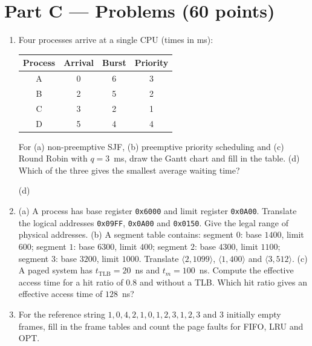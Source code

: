 \documentclass[11pt,a4paper]{article}
\begin{document}
\section*{Part C --- Problems \hfill (60 points)}
\begin{enumerate}[leftmargin=2.0em,label=C\arabic*.,itemsep=0.5em]
  \item {} Four processes arrive at a single CPU (times in ms):
  \begin{center}
  \begin{tabular}{@{}cccc@{}}
  \toprule
  \textbf{Process} & \textbf{Arrival} & \textbf{Burst} & \textbf{Priority} \\
  \midrule
  A & 0 & 6 & 3 \\ B & 2 & 5 & 2 \\ C & 3 & 2 & 1 \\ D & 5 & 4 & 4 \\
  \bottomrule
  \end{tabular}
  \end{center}
  For (a) non-preemptive SJF, (b) preemptive priority scheduling and (c) Round Robin with $q = 3$~ms, draw the Gantt chart and fill in the table. (d) Which of the three gives the smallest average waiting time?

  \proctable
  \proctable
  \proctable
  \par\medskip (d) \hrulefill

  \newpage
  \item {}
  (a) A process has base register \texttt{0x6000} and limit register \texttt{0x0A00}. Translate the logical addresses \texttt{0x09FF}, \texttt{0x0A00} and \texttt{0x0150}. Give the legal range of physical addresses. 
  \ans{2.6cm}
  (b) A segment table contains: segment $0$: base $1400$, limit $600$; segment $1$: base $6300$, limit $400$; segment $2$: base $4300$, limit $1100$; segment $3$: base $3200$, limit $1000$. Translate $\langle 2, 1099\rangle$, $\langle 1, 400\rangle$ and $\langle 3, 512\rangle$. 
  \ans{2.4cm}
  (c) A paged system has $t_{\text{TLB}} = 20$~ns and $t_m = 100$~ns. Compute the effective access time for a hit ratio of $0.8$ and without a TLB. Which hit ratio gives an effective access time of $128$~ns? 
  \ans{2.6cm}

  \item {} For the reference string $1, 0, 4, 2, 1, 0, 1, 2, 3, 1, 2, 3$ and $3$ initially empty frames, fill in the frame tables and count the page faults for FIFO, LRU and OPT.
  \par\medskip
  \par\medskip
  \par\medskip


\end{enumerate}
\end{document}

